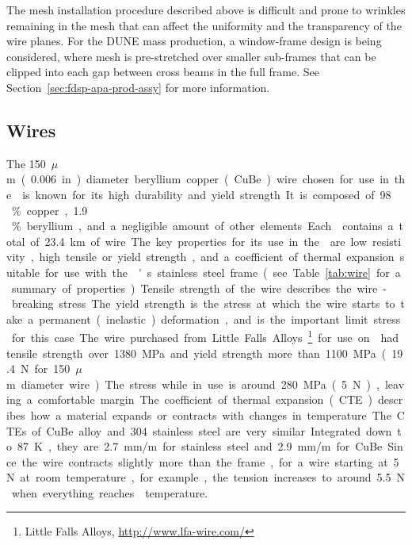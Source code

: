 The mesh installation procedure described above is difficult and prone to wrinkles remaining %
in the mesh that can affect the \efield uniformity and the transparency of the wire planes. For the DUNE mass production, a window-frame design is being considered, where mesh is pre-stretched over smaller sub-frames that can be clipped into each gap between cross beams in the full  frame.  See Section~\ref{sec:fdsp-apa-prod-assy} for more information.


\subsection{Wires}
\label{sec:fdsp-apa-wires}

The \SI{150}{$\mu$m} (\SI{.006}{in}) diameter beryllium copper (CuBe) wire chosen for use in the  is known for its high durability and yield strength. It is composed of \num{98}\,\% copper, \num{1.9}\,\% beryllium, and a negligible amount of other elements. Each  contains a total of \SI{23.4}{km} of wire.  

The key properties for its use in the  are low resistivity, high tensile or yield strength, and a coefficient of thermal expansion suitable for use with the 's stainless steel frame (see Table~\ref{tab:wire} for a summary of properties).  Tensile strength of the wire describes the wire-breaking stress.  The yield strength is the stress at which the wire starts to take a permanent (inelastic) deformation, and is the important limit stress for this case.  The wire purchased from Little Falls Alloys~\footnote{Little Falls Alloys\texttrademark, \url{http://www.lfa-wire.com/}} for use on  had tensile strength over \SI{1380}{MPa} and yield strength more than \SI{1100}{MPa} (\SI{19.4}{N} for \SI{150}{$\mu$m} diameter wire).  The stress while in use is around \SI{280}{MPa} (\SI{5}{N}), leaving a comfortable margin.

The coefficient of thermal expansion (CTE) describes how a material expands or contracts with changes in temperature.  The CTEs of CuBe alloy and \num{304} stainless steel are very similar.  Integrated down to \SI{87}{K}, they are \SI{2.7}{mm/m} for stainless steel and \SI{2.9}{mm/m} for CuBe. Since the wire contracts slightly more than the frame, for a wire starting at \SI{5}{N} at room temperature, for example, the tension increases to around \SI{5.5}{N} when everything reaches \lar temperature.  

